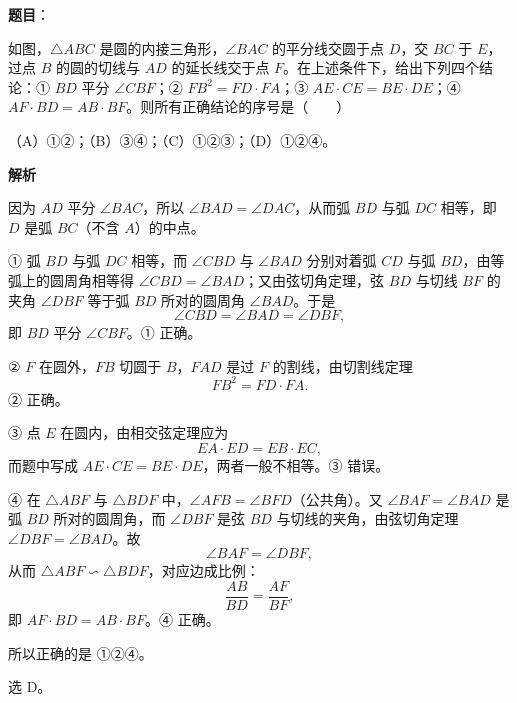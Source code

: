 \begin{answer}

\textbf{题目}：

如图，$\triangle ABC$ 是圆的内接三角形，$\angle BAC$ 的平分线交圆于点 $D$，交 $BC$ 于 $E$，过点 $B$ 的圆的切线与 $AD$ 的延长线交于点 $F$。在上述条件下，给出下列四个结论：① $BD$ 平分 $\angle CBF$；② $FB^2=FD\cdot FA$；③ $AE\cdot CE=BE\cdot DE$；④ $AF\cdot BD=AB\cdot BF$。则所有正确结论的序号是\mbox{（　　）}
\nopagebreak[4]
\begin{center}\end{center}
\nopagebreak[4]
（A）①②；（B）③④；（C）①②③；（D）①②④。

\textbf{解析}

因为 $AD$ 平分 $\angle BAC$，所以 $\angle BAD=\angle DAC$，从而弧 $BD$ 与弧 $DC$ 相等，即 $D$ 是弧 $BC$（不含 $A$）的中点。

① 弧 $BD$ 与弧 $DC$ 相等，而 $\angle CBD$ 与 $\angle BAD$ 分别对着弧 $CD$ 与弧 $BD$，由等弧上的圆周角相等得 $\angle CBD=\angle BAD$；又由弦切角定理，弦 $BD$ 与切线 $BF$ 的夹角 $\angle DBF$ 等于弧 $BD$ 所对的圆周角 $\angle BAD$。于是
\nopagebreak[4]
\[\angle CBD=\angle BAD=\angle DBF,\]
即 $BD$ 平分 $\angle CBF$。① 正确。

② $F$ 在圆外，$FB$ 切圆于 $B$，$FAD$ 是过 $F$ 的割线，由切割线定理
\nopagebreak[4]
\[FB^2=FD\cdot FA.\]
② 正确。

③ 点 $E$ 在圆内，由相交弦定理应为
\nopagebreak[4]
\[EA\cdot ED=EB\cdot EC,\]
而题中写成 $AE\cdot CE=BE\cdot DE$，两者一般不相等。③ 错误。

④ 在 $\triangle ABF$ 与 $\triangle BDF$ 中，$\angle AFB=\angle BFD$（公共角）。又 $\angle BAF=\angle BAD$ 是弧 $BD$ 所对的圆周角，而 $\angle DBF$ 是弦 $BD$ 与切线的夹角，由弦切角定理 $\angle DBF=\angle BAD$。故
\nopagebreak[4]
\[\angle BAF=\angle DBF,\]
从而 $\triangle ABF\backsim\triangle BDF$，对应边成比例：
\nopagebreak[4]
\[\frac{AB}{BD}=\frac{AF}{BF},\]
即 $AF\cdot BD=AB\cdot BF$。④ 正确。

所以正确的是 ①②④。

选 D。


\end{answer}
